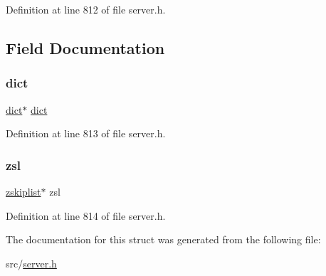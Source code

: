 Definition at line 812 of file server.\+h.



\subsection{Field Documentation}
\mbox{\label{structzset_aad961c2f260766ff3627bf363fef3551}} 
\subsubsection{\texorpdfstring{dict}{dict}}
{\footnotesize\ttfamily \hyperlink{structdict}{dict}$\ast$ \hyperlink{structdict}{dict}}



Definition at line 813 of file server.\+h.

\mbox{\label{structzset_a38454c6ad0755efc07170e913ec10b5a}} 
\subsubsection{\texorpdfstring{zsl}{zsl}}
{\footnotesize\ttfamily \hyperlink{structzskiplist}{zskiplist}$\ast$ zsl}



Definition at line 814 of file server.\+h.



The documentation for this struct was generated from the following file\+:\begin{DoxyCompactItemize}
\item 
src/\hyperlink{server_8h}{server.\+h}\end{DoxyCompactItemize}
